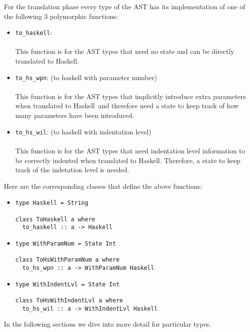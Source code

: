 \documentclass{article}
\def\H{Haskell}
\begin{document}
For the translation phase every type of the AST has its implementation of
one of the following 3 polymorphic functions:

\begin{itemize}
\item
\verb|to_haskell|:\\\\
This function is for the AST types that need no state and can be directly
translated to \H.
\item
\verb|to_hs_wpn|: (to haskell with parameter number) \\\\
This function is for the AST types that implicitly introduce extra
parameters when translated to \H\ and therefore need a state to keep track
of how many parameters have been introduced.
\item
\verb|to_hs_wil|: (to haskell with indentation level)\\\\
This function is for the AST types that need indentation level information to
be correctly indented when translated to \H. Therefore, a state to keep track
of the indetation level is needed.\\
\end{itemize}
Here are the corresponding classes that define the above functions:

\begin{itemize}
\item
\begin{verbatim}
type Haskell = String

class ToHaskell a where
  to_haskell :: a -> Haskell
\end{verbatim}

\item
\begin{verbatim}
type WithParamNum = State Int

class ToHsWithParamNum a where
  to_hs_wpn :: a -> WithParamNum Haskell
\end{verbatim}

\item
\begin{verbatim}
type WithIndentLvl = State Int

class ToHsWithIndentLvl a where
  to_hs_wil :: a -> WithIndentLvl Haskell
\end{verbatim}
\end{itemize}
In the following sections we dive into more detail for particular types.

\newpage
\end{document}
